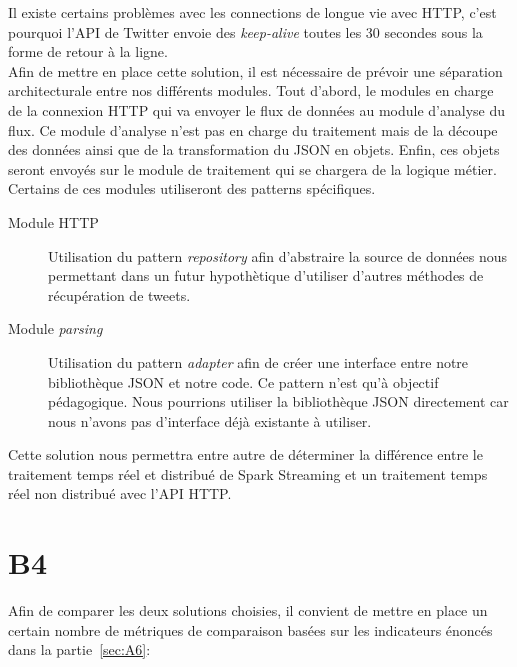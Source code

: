   Il existe certains problèmes avec les connections de longue vie avec HTTP, c'est pourquoi l'API de Twitter envoie des \textit{keep-alive} toutes les 30 secondes sous la forme de retour à la ligne.\\

  Afin de mettre en place cette solution, il est nécessaire de prévoir une séparation architecturale entre nos différents modules. Tout d'abord, le modules en charge de la connexion HTTP qui va envoyer le flux de données au module d'analyse du flux. Ce module d'analyse n'est pas en charge du traitement mais de la découpe des données ainsi que de la transformation du JSON en objets. Enfin, ces objets seront envoyés sur le module de traitement qui se chargera de la logique métier.\\

  Certains de ces modules utiliseront des patterns spécifiques.
  \begin{description}
    \item[Module HTTP] Utilisation du pattern \textit{repository} afin d'abstraire la source de données nous permettant dans un futur hypothètique d'utiliser d'autres méthodes de récupération de tweets.
    \item[Module \textit{parsing}] Utilisation du pattern \textit{adapter} afin de créer une interface entre notre bibliothèque JSON et notre code. Ce pattern n'est qu'à objectif pédagogique. Nous pourrions utiliser la bibliothèque JSON directement car nous n'avons pas d'interface déjà existante à utiliser.
  \end{description}

  Cette solution nous permettra entre autre de déterminer la différence entre le traitement temps réel et distribué de Spark Streaming et un traitement temps réel non distribué avec l'API HTTP.


\section{B4}
\label{sec:B4}
  Afin de comparer les deux solutions choisies, il convient de mettre en place un certain nombre de métriques de comparaison basées sur les indicateurs énoncés dans la partie~\ref{sec:A6}:

